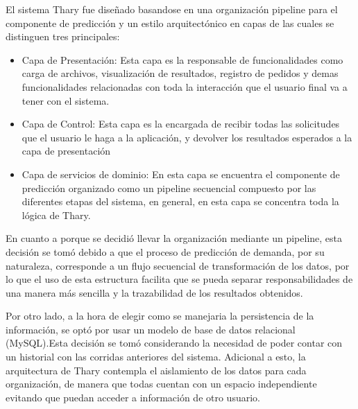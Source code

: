 El sistema Thary fue diseñado basandose en una organización pipeline para el componente de predicción y un estilo arquitectónico en capas de las cuales se distinguen tres principales:

\begin{itemize}
    \item Capa de Presentación: Esta capa es la responsable de funcionalidades como carga de archivos, visualización de resultados, registro de pedidos y demas funcionalidades relacionadas con toda la interacción que el usuario final va a tener con el sistema.
    \item Capa de Control: Esta capa es la encargada de recibir todas las solicitudes que el usuario le haga a la aplicación, y devolver los resultados esperados a la capa de presentación
    \item Capa de servicios de dominio: En esta capa se encuentra el componente de predicción organizado como un pipeline secuencial compuesto por las diferentes etapas del sistema, en general, en esta capa se concentra toda la lógica de Thary.
\end{itemize}

En cuanto a porque se decidió llevar la organización mediante un pipeline, esta decisión se tomó debido a que el proceso de predicción de demanda, por su naturaleza, corresponde a un flujo secuencial de transformación de los datos, por lo que el uso de esta estructura facilita que se pueda separar responsabilidades de una manera más sencilla y la trazabilidad de los resultados obtenidos.

Por otro lado, a la hora de elegir como se manejaria la persistencia de la información, se optó por usar un modelo de base de datos relacional (MySQL).Esta decisión se tomó considerando la necesidad de poder contar con un historial con las corridas anteriores del sistema. Adicional a esto, la arquitectura de Thary contempla el aislamiento de los datos para cada organización, de manera que todas cuentan con un espacio independiente evitando que puedan acceder a información de otro usuario.

